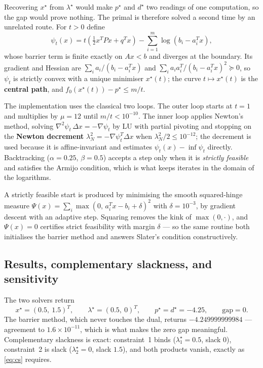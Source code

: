 \documentclass[11pt,a4paper]{article}
\theoremstyle{definition}
\newcommand{\pstar}{p^{\star}}
\newcommand{\dstar}{d^{\star}}
\newcommand{\xstar}{x^{\star}}
\newcommand{\lamstar}{\lambda^{\star}}
\begin{document}
Recovering $\xstar$ from $\lamstar$ would make $\pstar$ and $\dstar$ two readings of one
computation, so the gap would prove nothing. The primal is therefore solved a second time by an
unrelated route. For $t>0$ define
\begin{equation}\label{eq:barrier}
\psi_{t}(x)=t\left(\tfrac{1}{2}x^{T}Px+q^{T}x\right)-\sum_{i=1}^{m}\log(b_{i}-a_{i}^{T}x),
\end{equation}
whose barrier term is finite exactly on $Ax<b$ and diverges at the boundary. Its gradient and
Hessian are $\sum_{i}a_{i}/(b_{i}-a_{i}^{T}x)$ and
$\sum_{i}a_{i}a_{i}^{T}/(b_{i}-a_{i}^{T}x)^{2}\succeq 0$, so $\psi_{t}$ is strictly convex with a
unique minimiser $x^{\star}(t)$; the curve $t\mapsto x^{\star}(t)$ is the \textbf{central path},
and $f_{0}(x^{\star}(t))-\pstar\le m/t$.

The implementation uses the classical two loops. The outer loop starts at $t=1$ and multiplies by
$\mu=12$ until $m/t<10^{-10}$. The inner loop applies Newton's method, solving
$\nabla^{2}\psi_{t}\,\Delta x=-\nabla\psi_{t}$ by LU with partial pivoting and stopping on the
\textbf{Newton decrement} $\lambda_{N}^{2}=-\nabla\psi_{t}^{T}\Delta x$ when
$\lambda_{N}^{2}/2\le 10^{-12}$; the decrement is used because it is affine-invariant and
estimates $\psi_{t}(x)-\inf\psi_{t}$ directly. Backtracking ($\alpha=0.25$, $\beta=0.5$) accepts
a step only when it is \emph{strictly feasible} and satisfies the Armijo condition, which is what
keeps iterates in the domain of the logarithms.

A strictly feasible start is produced by minimising the smooth squared-hinge measure
$\Psi(x)=\sum_{i}\max(0,\,a_{i}^{T}x-b_{i}+\delta)^{2}$ with $\delta=10^{-3}$, by gradient
descent with an adaptive step. Squaring removes the kink of $\max(0,\cdot)$, and $\Psi(x)=0$
certifies strict feasibility with margin $\delta$ --- so the same routine both initialises the
barrier method and answers Slater's condition constructively.

\subsection{Results, complementary slackness, and sensitivity}

The two solvers return
\[
\xstar=(0.5,\ 1.5)^{T},\qquad \lamstar=(0.5,\ 0)^{T},\qquad
\pstar=\dstar=-4.25,\qquad \text{gap}=0.
\]
The barrier method, which never touches the dual, returns $-4.249999999984$ --- agreement to
$1.6\times 10^{-11}$, which is what makes the zero gap meaningful. Complementary slackness is
exact: constraint~1 binds ($\lambda_{1}^{\star}=0.5$, slack $0$), constraint~2 is slack
($\lambda_{2}^{\star}=0$, slack $1.5$), and both products vanish, exactly as \eqref{eq:cs}
requires.
\end{document}
